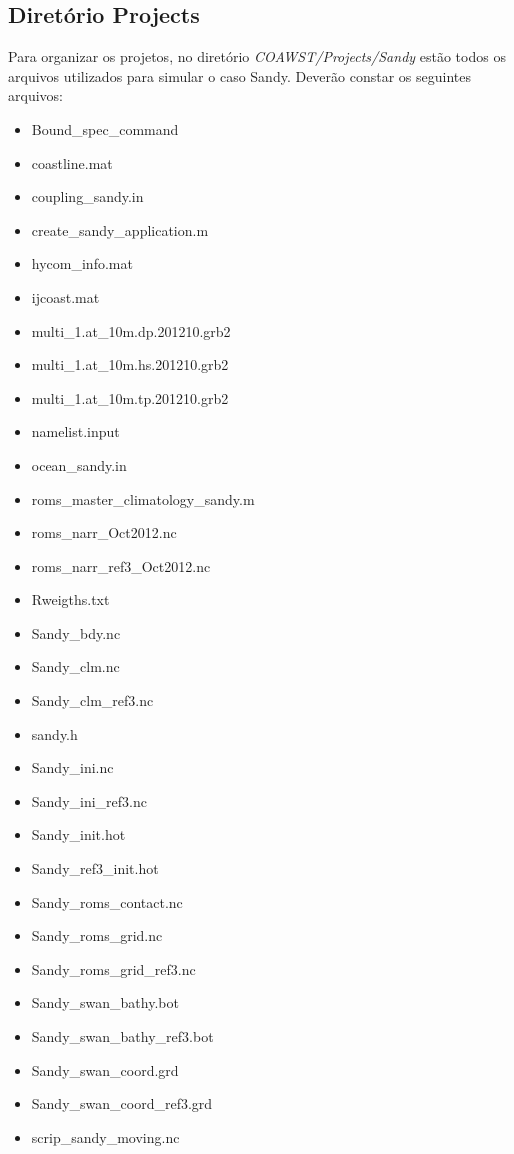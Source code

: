 \subsection{Diretório Projects}
\bigskip

\noindent Para organizar os projetos, no diretório \textit{COAWST/Projects/Sandy} estão todos os arquivos utilizados para simular o
          caso Sandy. Deverão constar os seguintes arquivos:
\bigskip

\begin{itemize}
\item Bound\_spec\_command
\item coastline.mat
\item coupling\_sandy.in
\item create\_sandy\_application.m
\item hycom\_info.mat
\item ijcoast.mat
\item multi\_1.at\_10m.dp.201210.grb2
\item multi\_1.at\_10m.hs.201210.grb2
\item multi\_1.at\_10m.tp.201210.grb2
\item namelist.input
\item ocean\_sandy.in
\item roms\_master\_climatology\_sandy.m
\item roms\_narr\_Oct2012.nc
\item roms\_narr\_ref3\_Oct2012.nc
\item Rweigths.txt
\item Sandy\_bdy.nc
\item Sandy\_clm.nc
\item Sandy\_clm\_ref3.nc
\item sandy.h
\item Sandy\_ini.nc
\item Sandy\_ini\_ref3.nc
\item Sandy\_init.hot
\item Sandy\_ref3\_init.hot
\item Sandy\_roms\_contact.nc
\item Sandy\_roms\_grid.nc
\item Sandy\_roms\_grid\_ref3.nc
\item Sandy\_swan\_bathy.bot
\item Sandy\_swan\_bathy\_ref3.bot
\item Sandy\_swan\_coord.grd
\item Sandy\_swan\_coord\_ref3.grd
\item scrip\_sandy\_moving.nc

\end{itemize}
